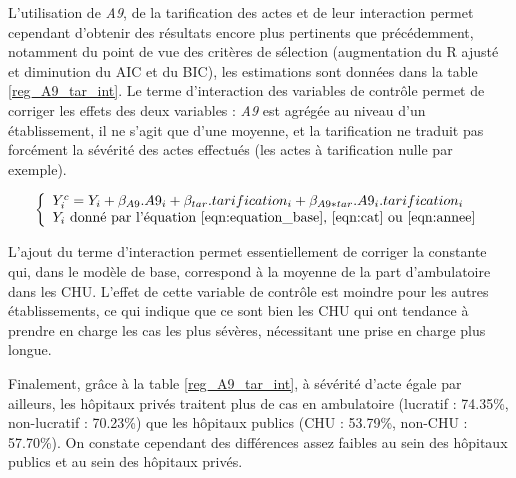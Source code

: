 L'utilisation de \textit{A9}, de la tarification des actes et de leur interaction permet cependant d'obtenir des résultats encore plus pertinents que précédemment, notamment du point de vue des critères de sélection (augmentation du R ajusté et diminution du AIC et du BIC), les estimations sont données dans la table \ref{reg_A9_tar_int}. Le terme d'interaction des variables de contrôle permet de corriger les effets des deux variables : \textit{A9} est agrégée au niveau d'un établissement, il ne s'agit que d'une moyenne, et la tarification ne traduit pas forcément la sévérité des actes effectués (les actes à tarification nulle par exemple). 

\begin{equation} \label{eqn:controle}
    \left\{
    \begin{array}{ll}
        Y^c_i = Y_i + \beta_{A9}.A9_i + \beta_{tar}.tarification_i + \beta_{A9*tar}.A9_i.tarification_i\\
        Y_i \text{  donné par l'équation \ref{eqn:equation_base}, \ref{eqn:cat} ou \ref{eqn:annee}}
    \end{array}
\right.
\end{equation}

\bigskip

L'ajout du terme d'interaction permet essentiellement de corriger la constante qui, dans le modèle de base, correspond à la moyenne de la part d'ambulatoire dans les CHU. L'effet de cette variable de contrôle est moindre pour les autres établissements, ce qui indique que ce sont bien les CHU qui ont tendance à prendre en charge les cas les plus sévères, nécessitant une prise en charge plus longue.

Finalement, grâce à la table \ref{reg_A9_tar_int}, à sévérité d'acte égale par ailleurs, les hôpitaux privés traitent plus de cas en ambulatoire (lucratif : 74.35\%, non-lucratif : 70.23\%) que les hôpitaux publics (CHU : 53.79\%, non-CHU : 57.70\%). On constate cependant des différences assez faibles au sein des hôpitaux publics et au sein des hôpitaux privés.\\



